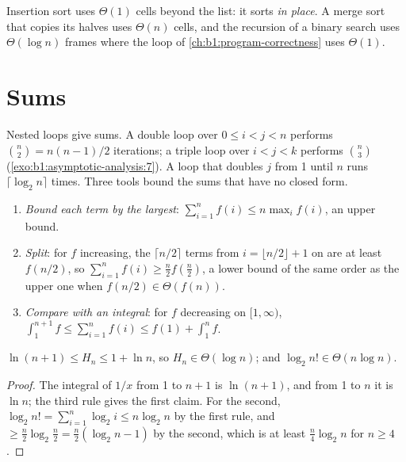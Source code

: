 Insertion sort uses $\Theta(1)$ cells beyond the list: it sorts \emph{in place}. A merge sort that copies its halves
uses $\Theta(n)$ cells, and the recursion of a binary search uses $\Theta(\log n)$ frames where the loop of
\cref{ch:b1:program-correctness} uses $\Theta(1)$.

\section{Sums}\label{sec:b1:asymptotic-analysis:sums}

Nested loops give sums. A double loop over $0 \leq i < j < n$ performs $\binom{n}{2} = n(n - 1)/2$ iterations; a triple
loop over $i < j < k$ performs $\binom{n}{3}$ (\cref{exo:b1:asymptotic-analysis:7}). A loop that doubles $j$ from 1
until $n$ runs $\lceil \log_2 n \rceil$ times. Three tools bound the sums that have no closed form.

\begin{method}\label{met:b1:asymptotic-analysis:sums}
\begin{enumerate}
\item \emph{Bound each term by the largest}: $\sum_{i=1}^{n} f(i) \leq n \max_i f(i)$, an upper bound.
\item \emph{Split}: for $f$ increasing, the $\lceil n/2 \rceil$ terms from $i = \lfloor n/2 \rfloor + 1$ on are at least
$f(n/2)$, so $\sum_{i=1}^n f(i) \geq \frac{n}{2} f(\frac{n}{2})$, a lower bound of the same order as the upper one when
$f(n/2) \in \Theta(f(n))$.
\item \emph{Compare with an integral}: for $f$ decreasing on $[1, \infty)$, $\int_1^{n + 1} f \leq \sum_{i=1}^n f(i)
\leq f(1) + \int_1^n f$.
\end{enumerate}
\end{method}

\begin{proposition}\label{prop:b1:asymptotic-analysis:harmonic}
$\ln(n + 1) \leq H_n \leq 1 + \ln n$, so $H_n \in \Theta(\log n)$; and $\log_2 n! \in \Theta(n \log n)$.
\end{proposition}

\begin{proof}
The integral of $1/x$ from 1 to $n + 1$ is $\ln(n + 1)$, and from 1 to $n$ it is $\ln n$; the third rule gives the first
claim. For the second, $\log_2 n! = \sum_{i=1}^n \log_2 i \leq n \log_2 n$ by the first rule, and $\geq \frac{n}{2}
\log_2 \frac{n}{2} = \frac{n}{2}(\log_2 n - 1)$ by the second, which is at least $\frac{n}{4}\log_2 n$ for $n \geq 4$.
\end{proof}


